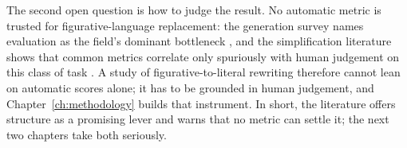 The second open question is how to judge the result. No automatic metric is
trusted for figurative-language replacement: the generation survey names
evaluation as the field's dominant bottleneck \cite{Lai2024}, and the
simplification literature shows that common metrics correlate only spuriously
with human judgement on this class of task \cite{Alva-Manchego2021,Scialom2021}.
A study of figurative-to-literal rewriting therefore cannot lean on automatic
scores alone; it has to be grounded in human judgement, and Chapter~\ref{ch:methodology}
builds that instrument. In short, the literature offers structure as a promising
lever and warns that no metric can settle it; the next two chapters take both
seriously.

\newpage

